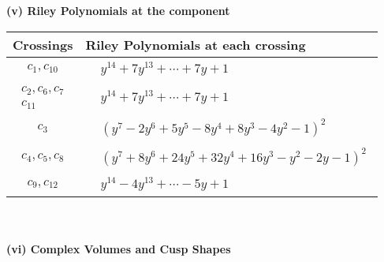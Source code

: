 \documentclass[1p]{elsarticle_modified}
\theoremstyle{definition}
\begin{document}
\newpage\renewcommand{\arraystretch}{1}
\flushleft \textbf{(v) Riley Polynomials at the component}\newline \\
\begin{tabular}{m{50pt}|m{274pt}}
Crossings & \hspace{64pt}Riley Polynomials at each crossing \\
\hline $$\begin{aligned}c_{1},c_{10}\end{aligned}$$&$\begin{aligned}
&y^{14}+7 y^{13}+\cdots+7 y+1
\end{aligned}$\\
\hline $$\begin{aligned}c_{2},c_{6},c_{7}\\c_{11}\end{aligned}$$&$\begin{aligned}
&y^{14}+7 y^{13}+\cdots+7 y+1
\end{aligned}$\\
\hline $$\begin{aligned}c_{3}\end{aligned}$$&$\begin{aligned}
&(y^7-2 y^6+5 y^5-8 y^4+8 y^3-4 y^2-1)^2
\end{aligned}$\\
\hline $$\begin{aligned}c_{4},c_{5},c_{8}\end{aligned}$$&$\begin{aligned}
&(y^7+8 y^6+24 y^5+32 y^4+16 y^3- y^2-2 y-1)^2
\end{aligned}$\\
\hline $$\begin{aligned}c_{9},c_{12}\end{aligned}$$&$\begin{aligned}
&y^{14}-4 y^{13}+\cdots-5 y+1
\end{aligned}$\\
\hline
\end{tabular}\\~\\
\newpage\flushleft \textbf{(vi) Complex Volumes and Cusp Shapes}
\end{document}
